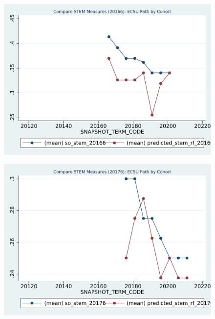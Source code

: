 \begin{figure}[h!]
\begin{centering}
\includegraphics[scale=1]{"figures/ECSU_20166_COMPARE_path_by_cohort_CAREER_STEM"}
\end{centering}
\end{figure}
\newpage
\begin{figure}[h!]
\begin{centering}
\includegraphics[scale=1]{"figures/ECSU_20176_COMPARE_path_by_cohort_CAREER_STEM"}
\end{centering}
\end{figure}
\newpage
